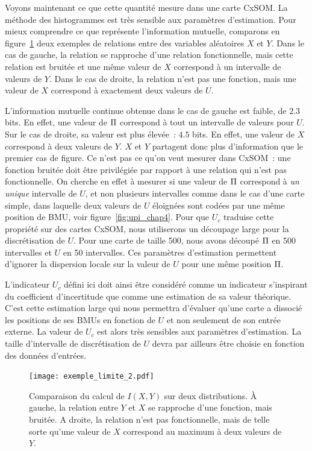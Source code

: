 \documentclass[../main]{subfiles}
\begin{document}
Voyons maintenant ce que cette quantité mesure dans une carte CxSOM.
La méthode des histogrammes est très sensible aux paramètres d'estimation. 
Pour mieux comprendre ce que représente l'information mutuelle, comparons en figure~\ref{fig:exemple-limite} deux exemples de relations entre des variables aléatoires $X$ et $Y$.
Dans le cas de gauche, la relation se rapproche d'une relation fonctionnelle, mais cette relation est bruitée et une même valeur de $X$ correspond à un intervalle de valeurs de $Y$. Dans le cas de droite, la relation n'est pas une fonction, mais une valeur de $X$ correspond à exactement deux valeurs de $U$.

L'information mutuelle continue obtenue dans le cas de gauche est faible, de $2.3$ bits.
En effet, une valeur de $\Pi$ correspond à tout un intervalle de valeurs pour $U$. 
Sur le cas de droite, sa valeur est plus élevée~: $4.5$ bits. En effet, une valeur de $X$ correspond à deux valeurs de $Y$. $X$ et $Y$ partagent donc plus d'information que le premier cas de figure.
Ce n'est pas ce qu'on veut mesurer dans CxSOM~: une fonction bruitée doit être privilégiée par rapport à une relation qui n'est pas fonctionnelle.
On cherche en effet à mesurer si une valeur de $\Pi$ correspond à \emph{un unique} intervalle de $U$, et non plusieurs intervalles comme dans le cas d'une carte simple, dans laquelle deux valeurs de $U$ éloignées sont codées par une même position de BMU, voir figure~\ref{fig:upi_chap4}.
Pour que $U_c$ traduise cette propriété sur des cartes CxSOM, nous utiliserons un découpage large pour la discrétisation de $U$. Pour une carte de taille 500, nous avons découpé $\Pi$ en 500 intervalles et $U$ en 50 intervalles.
Ces paramètres d'estimation permettent d'ignorer la dispersion locale sur la valeur de $U$ pour une même position $\Pi$.

L'indicateur $U_c$ défini ici doit ainsi être considéré comme un indicateur s'inspirant du coefficient d'incertitude que comme une estimation de sa valeur théorique.
C'est cette estimation large qui nous permettra d'évaluer qu'une carte a dissocié les positions de ses BMUs en fonction de $U$ et non seulement de son entrée externe.
La valeur de $U_c$ est alors très sensibles aux paramètres d'estimation. 
La taille d'intervalle de discrétisation de $U$ devra par ailleurs être choisie en fonction des données d'entrées.

\begin{figure}
    \centering
    \texttt{[image: exemple\_limite\_2.pdf]}
    \caption{Comparaison du calcul de $I(X,Y)$ sur deux distributions. \`A gauche, la relation entre $Y$ et $X$ se rapproche d'une fonction, mais bruitée. A droite, la relation n'est pas fonctionnelle, mais de telle sorte qu'une valeur de $X$ correspond au maximum à deux valeurs de $Y$.}
    \label{fig:exemple-limite}
    \end{figure}
\end{document}
